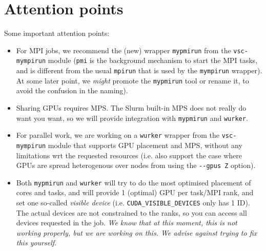 



\section{Attention points}
\label{sec:gpu_ugent_attention_points}

Some important attention points:

\begin{itemize}
\item For MPI jobs, we recommend the (new) wrapper \lstinline|mypmirun| from the \lstinline|vsc-mympirun| module
  (\lstinline|pmi| is the background mechanism to start the MPI tasks,
  and is different from the usual \lstinline|mpirun| that is used by the \lstinline|mympirun| wrapper).
  At some later point, we \emph{might} promote the \lstinline|mypmirun| tool or rename it,
  to avoid the confusion in the naming).
\item Sharing GPUs requires MPS. The Slurm built-in MPS does not really do want you want, so we will provide integration with
  \lstinline|mypmirun| and \lstinline|wurker|.
\item For parallel work, we are working on a \lstinline|wurker| wrapper from the \lstinline|vsc-mympirun| module that supports
  GPU placement and MPS, without any limitations wrt the requested resources (i.e. also support the case where GPUs
  are spread heterogenous over nodes from using the \lstinline|--gpus Z| option).
\item Both \lstinline|mypmirun| and \lstinline|wurker| will try to do the most optimised placement of cores and tasks, and
  will provide 1 (optimal) GPU per task/MPI rank, and set one so-called \emph{visible device}
  (i.e. \lstinline|CUDA_VISIBLE_DEVICES| only has 1 ID). The actual devices are not constrained to the ranks,
  so you can access all devices requested in the job.
  \emph{We know that at this moment, this is not working properly, but we are working on this. We advise against trying to fix this yourself.}
\end{itemize}

